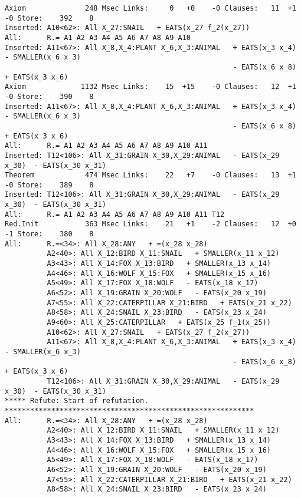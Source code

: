 {\begin{verbatim}
Axiom              248 Msec Links:     0   +0    -0 Clauses:   11  +1  -0 Store:    392    8
Inserted: A10<62>: All X_27:SNAIL   + EATS(x_27 f_2(x_27))
All:      R.= A1 A2 A3 A4 A5 A6 A7 A8 A9 A10 
Inserted: A11<67>: All X_8,X_4:PLANT X_6,X_3:ANIMAL   + EATS(x_3 x_4)  - SMALLER(x_6 x_3)
                                                      - EATS(x_6 x_8)  + EATS(x_3 x_6)
Axiom             1132 Msec Links:    15  +15    -0 Clauses:   12  +1  -0 Store:    390    8
Inserted: A11<67>: All X_8,X_4:PLANT X_6,X_3:ANIMAL   + EATS(x_3 x_4)  - SMALLER(x_6 x_3)
                                                      - EATS(x_6 x_8)  + EATS(x_3 x_6)
All:      R.= A1 A2 A3 A4 A5 A6 A7 A8 A9 A10 A11 
Inserted: T12<106>: All X_31:GRAIN X_30,X_29:ANIMAL   - EATS(x_29 x_30)  - EATS(x_30 x_31)
Theorem            474 Msec Links:    22   +7    -0 Clauses:   13  +1  -0 Store:    389    8
Inserted: T12<106>: All X_31:GRAIN X_30,X_29:ANIMAL   - EATS(x_29 x_30)  - EATS(x_30 x_31)
All:      R.= A1 A2 A3 A4 A5 A6 A7 A8 A9 A10 A11 T12 
Red.Init           363 Msec Links:    21   +1    -2 Clauses:   12  +0  -1 Store:    380    8
All:      R.=<34>: All X_28:ANY   + =(x_28 x_28)
          A2<40>: All X_12:BIRD X_11:SNAIL   + SMALLER(x_11 x_12)
          A3<43>: All X_14:FOX X_13:BIRD   + SMALLER(x_13 x_14)
          A4<46>: All X_16:WOLF X_15:FOX   + SMALLER(x_15 x_16)
          A5<49>: All X_17:FOX X_18:WOLF   - EATS(x_18 x_17)
          A6<52>: All X_19:GRAIN X_20:WOLF   - EATS(x_20 x_19)
          A7<55>: All X_22:CATERPILLAR X_21:BIRD   + EATS(x_21 x_22)
          A8<58>: All X_24:SNAIL X_23:BIRD   - EATS(x_23 x_24)
          A9<60>: All X_25:CATERPILLAR   + EATS(x_25 f_1(x_25))
          A10<62>: All X_27:SNAIL   + EATS(x_27 f_2(x_27))
          A11<67>: All X_8,X_4:PLANT X_6,X_3:ANIMAL   + EATS(x_3 x_4)  - SMALLER(x_6 x_3)
                                                      - EATS(x_6 x_8)  + EATS(x_3 x_6)
          T12<106>: All X_31:GRAIN X_30,X_29:ANIMAL   - EATS(x_29 x_30)  - EATS(x_30 x_31)
***** Refute: Start of refutation. ***********************************************************
All:      R.=<34>: All X_28:ANY   + =(x_28 x_28)
          A2<40>: All X_12:BIRD X_11:SNAIL   + SMALLER(x_11 x_12)
          A3<43>: All X_14:FOX X_13:BIRD   + SMALLER(x_13 x_14)
          A4<46>: All X_16:WOLF X_15:FOX   + SMALLER(x_15 x_16)
          A5<49>: All X_17:FOX X_18:WOLF   - EATS(x_18 x_17)
          A6<52>: All X_19:GRAIN X_20:WOLF   - EATS(x_20 x_19)
          A7<55>: All X_22:CATERPILLAR X_21:BIRD   + EATS(x_21 x_22)
          A8<58>: All X_24:SNAIL X_23:BIRD   - EATS(x_23 x_24)

\end{verbatim}}
